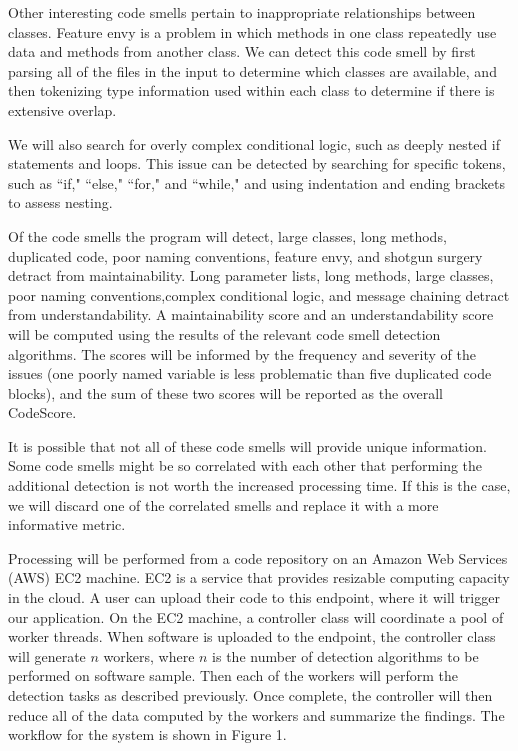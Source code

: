 \documentclass{sig-alternate}
\begin{document}
Other interesting code smells pertain to inappropriate relationships between classes. Feature envy is a problem in which methods in one class repeatedly use data and methods from another class. We can detect this code smell by first parsing all of the files in the input to determine which classes are available, and then tokenizing type information used within each class to determine if there is extensive overlap. 

We will also search for overly complex conditional logic, such as deeply nested if statements and loops. This issue can be detected by searching for specific tokens, such as ``if," ``else," ``for," and ``while," and using indentation and ending brackets to assess nesting.

Of the code smells the program will detect, large classes, long methods, duplicated code, poor naming conventions, feature envy, and shotgun surgery detract from maintainability. Long parameter lists, long methods, large classes, poor naming conventions,complex conditional logic, and message chaining detract from understandability. A maintainability score and an understandability score will be computed using the results of the relevant code smell detection algorithms. The scores will be informed by the frequency and severity of the issues (one poorly named variable is less problematic than five duplicated code blocks), and the sum of these two scores will be reported as the overall CodeScore.

It is possible that not all of these code smells will provide unique information. Some code smells might be so correlated with each other that performing the additional detection is not worth the increased processing time. If this is the case, we will discard one of the correlated smells and replace it with a more informative metric.

Processing will be performed from a code repository on an Amazon Web Services (AWS) EC2 machine. EC2 is a service that provides resizable computing capacity in the cloud. A user can upload their code to this endpoint, where it will trigger our application. On the EC2 machine, a controller class will coordinate a pool of worker threads. When software is uploaded to the endpoint, the controller class will generate $n$ workers, where $n$ is the number of detection algorithms to be performed on software sample. Then each of the workers will perform the detection tasks as described previously. Once complete, the controller will then reduce all of the data computed by the workers and summarize the findings. The workflow for the system is shown in Figure 1. 
\end{document}
